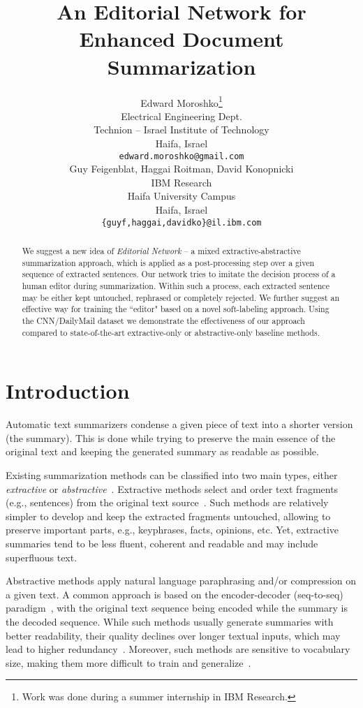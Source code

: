 \documentclass{article}
\title{An Editorial Network for Enhanced Document Summarization}
\author{
  Edward Moroshko\thanks{Work was done during a summer internship in IBM Research.} \\
  Electrical Engineering Dept.\\
  Technion -- Israel Institute of Technology\\
  Haifa, Israel \\
  \texttt{edward.moroshko@gmail.com} \\
   \And
  Guy Feigenblat, Haggai Roitman, David Konopnicki \\
  IBM Research\\
  Haifa University Campus\\
  Haifa, Israel \\
  \texttt{\{guyf,haggai,davidko\}@il.ibm.com} \\
  }
\date{}
\begin{document}
\maketitle
\begin{abstract}
We suggest a new idea of \textit{Editorial Network} -- a mixed extractive-abstractive summarization approach, which is applied as a post-processing step over a given sequence of extracted sentences. Our network tries to imitate the decision process of a human editor during summarization. Within such a process, each extracted sentence may be either kept untouched, rephrased or completely rejected. We further suggest an effective way for training the ``editor" based on a novel soft-labeling approach. Using the CNN/DailyMail dataset we demonstrate the effectiveness of our approach compared to state-of-the-art extractive-only or abstractive-only baseline methods.
\end{abstract}

\section{Introduction}\label{sec:intro}
Automatic text summarizers condense a given piece of text into a shorter version (the summary). This is done while trying to preserve the main essence of the original text and keeping the generated summary as readable as possible.

Existing summarization methods can be classified into two main types, either \textit{extractive} or \textit{abstractive}~\cite{Gambhir:2017}. Extractive methods select and order text fragments (e.g., sentences) from the original text source~\cite{Cheng2016ACL,Dlikman2016UsingML,DBLP:conf/emnlp/DongSCHC18,summit2017,Nallapati2017a,ZhangLatent2018}. Such methods are relatively simpler to develop and keep the extracted fragments untouched, allowing to preserve important parts, e.g., keyphrases, facts, opinions, etc. Yet, extractive summaries tend to be less fluent, coherent and readable and may include superfluous text.

Abstractive methods apply natural language paraphrasing and/or compression on a given text. A common approach is based on the encoder-decoder (seq-to-seq) paradigm~\cite{Sutskever2014Seq}, with the original text sequence being encoded while the summary is the decoded sequence. While such methods usually generate summaries with better readability, their quality declines over longer textual inputs, which may lead to higher redundancy~\cite{Paulus2017ADR}. Moreover, such methods are sensitive to vocabulary size, making them more difficult to train and generalize~\cite{See2017GetTT}.
\end{document}
